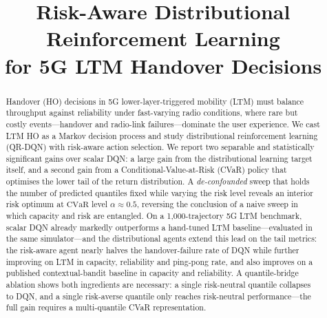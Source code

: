 \documentclass[conference]{IEEEtran}
\begin{document}
\title{Risk-Aware Distributional Reinforcement Learning\\for 5G LTM Handover Decisions}

\author{
\and
{}
\and
{}
}

\maketitle

\begin{abstract}
Handover (HO) decisions in 5G lower-layer-triggered mobility (LTM) must
balance throughput against reliability under fast-varying radio conditions,
where rare but costly events---handover and radio-link failures---dominate
the user experience. We cast LTM HO as a Markov decision process and study
distributional reinforcement learning (QR-DQN) with risk-aware action
selection. We report two separable and statistically significant gains over
scalar DQN: a large gain from the distributional learning target itself, and
a second gain from a Conditional-Value-at-Risk (CVaR) policy that optimises
the lower tail of the return distribution. A \emph{de-confounded} sweep that
holds the number of predicted quantiles fixed while varying the risk level
reveals an interior risk optimum at $\mathrm{CVaR}$ level $\alpha\!\approx\!0.5$,
reversing the conclusion of a naive sweep in which capacity and risk are
entangled. On a 1{,}000-trajectory 5G LTM benchmark, scalar DQN already markedly
outperforms a hand-tuned LTM baseline---evaluated in the same simulator---and
the distributional agents extend this lead on the tail metrics: the risk-aware
agent nearly halves the handover-failure rate of DQN while further improving on
LTM in capacity, reliability and ping-pong rate, and also improves on a
published contextual-bandit baseline in capacity and reliability. A quantile-bridge
ablation shows both ingredients are necessary: a single risk-neutral quantile
collapses to DQN, and a single risk-averse quantile only reaches risk-neutral
performance---the full gain requires a multi-quantile CVaR representation.
\end{abstract}
\end{document}
